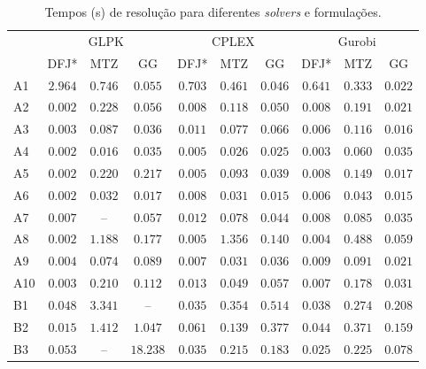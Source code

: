 \begin{table}
\centering
\caption{Tempos (s) de resolução para diferentes \emph{solvers} e formulações.}\label{tab:tempos pcv}
\begin{threeparttable}
\begin{tabular}{lccccccccc}
\toprule
& \multicolumn{3}{c}{GLPK} & \multicolumn{3}{c}{CPLEX} & \multicolumn{3}{c}{Gurobi}
\\\cmidrule(lr){2-4}\cmidrule(lr){5-7}\cmidrule(lr){8-10}
           & DFJ* & MTZ & GG & DFJ* & MTZ & GG & DFJ* & MTZ & GG\\\midrule
A1 & $2.964$ & $0.746$ & $\mathbf{0.055}$ & $0.703$ & $0.461$ & $\mathbf{0.046}$ & $0.641$ & $0.333$ & $\mathbf{0.022}$\\
A2 & $\mathbf{0.002}$ & $0.228$ & $0.056$ & $\mathbf{0.008}$ & $0.118$ & $0.050$ & $\mathbf{0.008}$ & $0.191$ & $0.021$\\
A3 & $\mathbf{0.003}$ & $0.087$ & $0.036$ & $\mathbf{0.011}$ & $0.077$ & $0.066$ & $\mathbf{0.006}$ & $0.116$ & $0.016$\\
A4 & $\mathbf{0.002}$ & $0.016$ & $0.035$ & $\mathbf{0.005}$ & $0.026$ & $0.025$ & $\mathbf{0.003}$ & $0.060$ & $0.035$\\
A5 & $\mathbf{0.002}$ & $0.220$ & $0.217$ & $\mathbf{0.005}$ & $0.093$ & $0.039$ & $\mathbf{0.008}$ & $0.149$ & $0.017$\\
A6 & $\mathbf{0.002}$ & $0.032$ & $0.017$ & $\mathbf{0.008}$ & $0.031$ & $0.015$ & $\mathbf{0.006}$ & $0.043$ & $0.015$\\
A7 & $\mathbf{0.007}$ & -- & $0.057$ & $\mathbf{0.012}$ & $0.078$ & $0.044$ & $\mathbf{0.008}$ & $0.085$ & $0.035$\\
A8 & $\mathbf{0.002}$ & $1.188$ & $0.177$ & $\mathbf{0.005}$ & $1.356$ & $0.140$ & $\mathbf{0.004}$ & $0.488$ & $0.059$\\
A9 & $\mathbf{0.004}$ & $0.074$ & $0.089$ & $\mathbf{0.007}$ & $0.031$ & $0.036$ & $\mathbf{0.009}$ & $0.091$ & $0.021$\\
A10 & $\mathbf{0.003}$ & $0.210$ & $0.112$ & $\mathbf{0.013}$ & $0.049$ & $0.057$ & $\mathbf{0.007}$ & $0.178$ & $0.031$\\
B1 & $\mathbf{0.048}$ & $3.341$ & -- & $\mathbf{0.035}$ & $0.354$ & $0.514$ & $\mathbf{0.038}$ & $0.274$ & $0.208$\\
B2 & $\mathbf{0.015}$ & $1.412$ & $1.047$ & $\mathbf{0.061}$ & $0.139$ & $0.377$ & $\mathbf{0.044}$ & $0.371$ & $0.159$\\
B3 & $\mathbf{0.053}$ & -- & $18.238$ & $\mathbf{0.035}$ & $0.215$ & $0.183$ & $\mathbf{0.025}$ & $0.225$ & $0.078$\\

\end{tabular}
\end{threeparttable}
\end{table}
